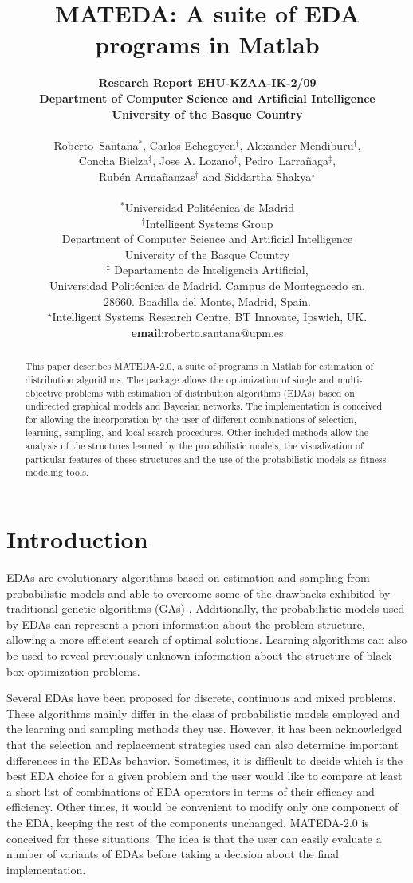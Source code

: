 \documentclass[a4paper]{article}
\title{MATEDA: A suite of EDA programs in Matlab}
\author{
{\bf{Research Report  EHU-KZAA-IK-2/09}} \\
{\bf{Department of Computer Science and Artificial Intelligence}}\\
{\bf{ University of the Basque Country}}\\ \\
Roberto~Santana$^\ast$, Carlos Echegoyen$^\dagger$, Alexander Mendiburu$^\dagger$,\\
 Concha Bielza$^\ddagger$, Jose A. Lozano$^\dagger$, Pedro~Larra\~naga$^\ddagger$,\\
 Rub\'en Arma\~nanzas$^\dagger$ and Siddartha Shakya$^\star$\\\\
$^\ast$Universidad Polit\'ecnica de Madrid \\
$^\dagger$Intelligent Systems Group \\
  Department of Computer Science and  Artificial Intelligence \\
    University of the  Basque Country \\
$^\ddagger$ Departamento de Inteligencia Artificial,\\
 Universidad Polit\'ecnica de Madrid. Campus de Montegacedo sn. \\
 28660. Boadilla del Monte, Madrid, Spain.\\
$^\star$Intelligent Systems Research Centre, BT Innovate, Ipswich, UK. \\
 {\bf{email}}:roberto.santana@upm.es}%
\date{}
\begin{document}
\maketitle

\begin{abstract}                   
  This paper describes MATEDA-2.0, a suite of programs in Matlab for estimation of distribution algorithms.
   The package allows the optimization of single and multi-objective
    problems with estimation of distribution algorithms (EDAs)
  based on undirected graphical models and Bayesian networks. The
  implementation is conceived for allowing the incorporation by the user
  of  different combinations of selection, learning, sampling, and local
  search procedures. Other included methods allow the
  analysis of the structures learned by the probabilistic models,
  the visualization of particular features of these structures and the use of the probabilistic models as fitness modeling tools.
\end{abstract}

\tableofcontents{}

\newpage

\section{Introduction}

 EDAs \cite{Larranhaga_and_Lozano:2002,Lozano_et_al:2005,Muhlenbein_and_Paas:1996,Pelikan_et_al:2006} are evolutionary algorithms based
 on estimation and sampling from probabilistic
 models and able to overcome some of the drawbacks exhibited by
 traditional genetic algorithms (GAs)
  \cite{Goldberg:1989,Holland:1975}. Additionally, the probabilistic models used by EDAs
   can represent
   a priori information about the problem
 structure, allowing a more efficient search of optimal solutions. Learning algorithms can also be used to reveal
 previously unknown information about the structure of black box optimization problems.

  Several EDAs have been proposed for discrete, continuous and mixed
  problems. These algorithms mainly differ in the class of
  probabilistic models employed and the learning and sampling
  methods they use. However, it has been acknowledged that the selection and replacement
  strategies used can also determine important differences in the EDAs behavior.
   Sometimes, it is difficult to decide which is the best EDA choice for a given
   problem and the user would like to compare at least a short list of
   combinations of EDA operators in terms of their efficacy and
   efficiency. Other times, it would be convenient to modify only one
   component of the EDA, keeping the rest of the components
   unchanged. MATEDA-2.0 is conceived for these situations. The idea
   is that the user can easily evaluate a number of variants of EDAs
   before taking a decision about the final implementation.
\end{document}
